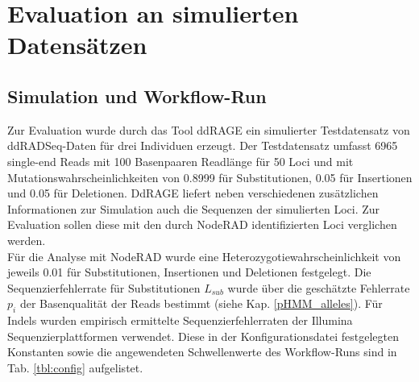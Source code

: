 \chapter{Evaluation an simulierten Datensätzen} \label{sec:eval}

\section{Simulation und Workflow-Run} \label{sec:sim}

Zur Evaluation wurde durch das Tool ddRAGE \cite{timm_2018, ddrage} ein simulierter Testdatensatz \cite{testdata} von ddRADSeq-Daten für drei Individuen erzeugt. Der Testdatensatz umfasst 6965 single-end Reads mit 100 Basenpaaren Readlänge für 50 Loci und mit Mutationswahrscheinlichkeiten von 0.8999 für Substitutionen, 0.05 für Insertionen und 0.05 für Deletionen. DdRAGE liefert neben verschiedenen zusätzlichen Informationen zur Simulation auch die Sequenzen der simulierten Loci. Zur Evaluation sollen diese mit den durch NodeRAD \cite{noderad} identifizierten Loci verglichen werden.\\

Für die Analyse mit NodeRAD wurde eine Heterozygotiewahrscheinlichkeit von jeweils 0.01 für Substitutionen, Insertionen und Deletionen festgelegt. Die Sequenzierfehlerrate für Substitutionen $L_{sub}$ wurde über die geschätzte Fehlerrate $p_{i}$ der Basenqualität der Reads bestimmt (siehe Kap. \ref{pHMM_alleles}). Für Indels wurden empirisch ermittelte Sequenzierfehlerraten der Illumina Sequenzierplattformen \cite{schirmer_2016} verwendet. Diese in der Konfigurationsdatei festgelegten Konstanten sowie die angewendeten Schwellenwerte des Workflow-Runs sind in Tab. \ref{tbl:config} aufgelistet. \\

